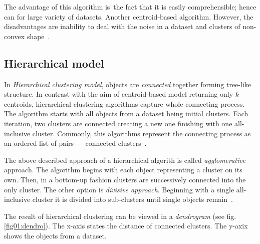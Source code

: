 The advantage of this algorithm is\ the fact that it is easily comprehensible; hence can  for large variety of datasets. Another  centroid-based algorithm. However, the disadvantages are inability to deal with the noise in a dataset and clusters of non-convex shape~\cite{uppada2014centroid}.
  

\subsection{Hierarchical model}

In \emph{Hierarchical clustering model}, objects are \emph{connected} together forming tree-like structure. In contrast with the aim of centroid-based model returning only $k$ centroids, hierarchical clustering algorithms capture whole connecting process. The algorithm starts with all objects from a dataset being initial clusters. Each iteration, two clusters are connected creating a new one finishing with one all-inclusive cluster. Commonly, this algorithms represent the connecting process as an ordered list of pairs --- connected clusters~\cite{karypis1999chameleon}.

The above described approach of a hierarchical algorith is called \emph{agglomerative} approach. The algorithm begins with each object representing a cluster on its own. Then, in a bottom-up fashion clusters are successively connected into the only cluster. The other option is \emph{divisive approach}. Beginning with a single all-inclusive cluster it is divided into sub-clusters until single objects remain~\cite{rokach2005clustering}. 

The result of hierarchical clustering can be viewed in a \emph{dendrogram} (see fig. \ref{fig01:dendro}). The x-axis states the distance of connected clusters. The y-axix shows the objects from a dataset.

